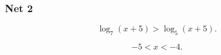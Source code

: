 \subsubsection{Net 2}
 
\zadatak
$$
\log_7 (x + 5) > \log_5 (x + 5).
$$

\resenje
$$
-5 < x < -4.
$$